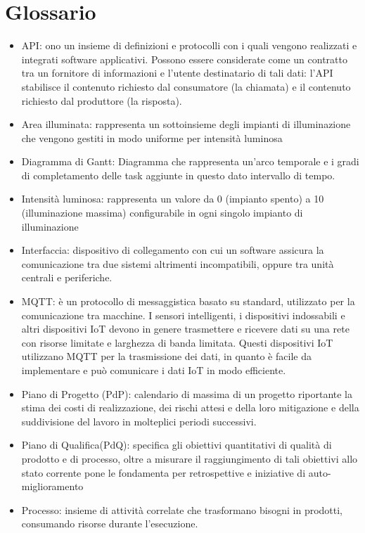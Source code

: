 \documentclass[12pt]{article}
\begin{document}
\section{Glossario}
\begin{itemize}
    \item API: ono un insieme di definizioni e protocolli con i quali vengono realizzati e integrati software applicativi. Possono essere considerate come un contratto tra un fornitore di informazioni e l'utente destinatario di tali dati: l'API stabilisce il contenuto richiesto dal consumatore (la chiamata) e il contenuto richiesto dal produttore (la risposta).
    \item Area illuminata: rappresenta un sottoinsieme degli impianti di illuminazione che vengono gestiti in modo uniforme per intensità luminosa
    \item Diagramma di Gantt: Diagramma che rappresenta un'arco temporale e i gradi di completamento delle task aggiunte in questo dato intervallo di tempo.
    \item Intensità luminosa: rappresenta un valore da 0 (impianto spento) a 10 (illuminazione massima) configurabile in ogni singolo impianto di illuminazione
    \item Interfaccia: dispositivo di collegamento con cui un software assicura la comunicazione tra due sistemi altrimenti incompatibili, oppure tra unità centrali e periferiche.
    \item MQTT: è un protocollo di messaggistica basato su standard, utilizzato per la comunicazione tra macchine. I sensori intelligenti, i dispositivi indossabili e altri dispositivi IoT devono in genere trasmettere e ricevere dati su una rete con risorse limitate e larghezza di banda limitata. Questi dispositivi IoT utilizzano MQTT per la trasmissione dei dati, in quanto è facile da implementare e può comunicare i dati IoT in modo efficiente.
    \item Piano di Progetto (PdP): calendario di massima di un progetto riportante la stima dei costi di realizzazione, dei rischi attesi e della loro mitigazione e della suddivisione del lavoro in molteplici periodi successivi. 
    \item Piano di Qualifica(PdQ): specifica gli obiettivi quantitativi di qualità di prodotto e di processo, oltre a misurare il raggiungimento di tali obiettivi allo stato corrente pone le fondamenta per retrospettive e iniziative di auto-miglioramento
    \item Processo: insieme di attività correlate che trasformano bisogni in prodotti, consumando risorse durante l'esecuzione.

\end{itemize}
\end{document}
